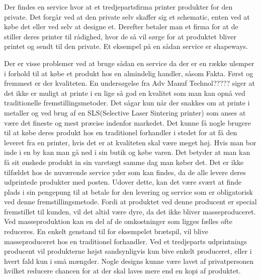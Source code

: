 Der findes en service hvor at et tredjepartsfirma printer produkter for den private. Det forgår ved at den private selv skaffer sig et schematic, enten ved at købe det eller ved selv at designe et. Derefter betaler man et firma for at de stiller deres printer til rådighed, hvor de så vil sørge for at produktet bliver printet og sendt til den private. Et eksempel på en sådan service er shapeways. \autocite{_shapeways_????}

Der er visse problemer ved at bruge sådan en service da der er en række ulemper i forhold til at købe et produkt hos en almindelig handler, såsom Fakta. Først og fremmest er der kvaliteten. En undersøgelse fra Adv Manuf Technol????? siger at det ikke er muligt at printe i en lige så god en kvalitet som man kan opnå ved traditionelle fremstillingsmetoder. Det sågar kun når der snakkes om at printe i metaller og ved brug af en SLS(Selective Laser Sintering printer) som anses at være det fineste og mest præcise indenfor markedet. Det kunne få nogle brugere til at købe deres produkt hos en traditionel forhandler i stedet for at få den leveret fra en printer, hvis det er at kvaliteten skal være meget høj.
Hvis man bor inde i en by kan man gå ned i sin butik og købe varen. Det betyder at man kan få sit ønskede produkt in sin varetægt samme dag man køber det. Det er ikke tilfældet hos de nuværende service yder som kan findes, da de alle levere deres udprintede produkter med posten.
Udover dette, kan det være svært at finde plads i sin pengepung til at betale for den levering og service som er obligatorisk ved denne fremstillingsmetode. Fordi at produktet ved denne producent er special fremstillet til kunden, vil det altid være dyre, da det ikke bliver masseproduceret. Ved masseproduktion kan en del af de omkostninger som ligges fælles ofte reduceres. En enkelt genstand til for eksempelet brætspil, vil blive masseproduceret hos en traditionel forhandler. Ved et tredjeparts udprintnings producent vil produkterne højst sandsynligvis kun bive enkelt produceret, eller i hvert fald kun i små mængder. Nogle designs kunne være lavet af privatpersonen hvilket reducere chancen for at der skal laves mere end en kopi af produktet.